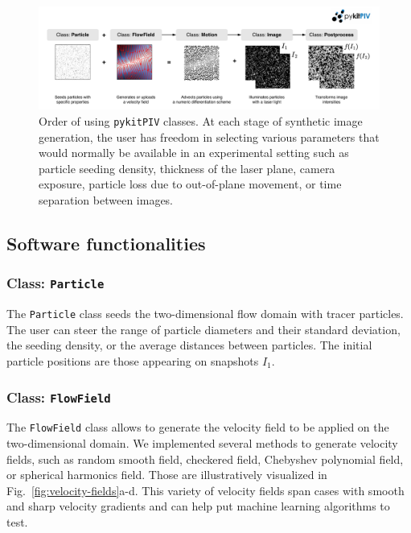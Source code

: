 \documentclass[a4paper,fleqn]{cas-dc}
\begin{document}
\begin{figure}[t]
\centering
\vspace{-0.4 in}
\includegraphics[width=\textwidth]{pykitPIV-modules.pdf}
\vspace{10 pt}
\caption{\footnotesize Order of using \texttt{pykitPIV} classes. At each stage of synthetic image generation, the user has freedom in selecting various parameters that would normally be available in an experimental setting such as particle seeding density, thickness of the laser plane, camera exposure, particle loss due to out-of-plane movement, or time separation between images.}
\label{fig:pykitPIV-overview}
\end{figure}

\subsection{Software functionalities}

\subsubsection{Class: \texttt{Particle}} \label{sec:class-Particle}

The \texttt{Particle} class seeds the two-dimensional flow domain with tracer particles. The user can steer the range of particle diameters and their standard deviation, the seeding density, or the average distances between particles. The initial particle positions are those appearing on snapshots $I_1$.

\subsubsection{Class: \texttt{FlowField}} \label{sec:class-FlowField}

The \texttt{FlowField} class allows to generate the velocity field to be applied on the two-dimensional domain. We implemented several methods to generate velocity fields, such as random smooth field, checkered field, Chebyshev polynomial field, or spherical harmonics field. Those are illustratively visualized in Fig.~\ref{fig:velocity-fields}a-d. This variety of velocity fields span cases with smooth and sharp velocity gradients and can help put machine learning algorithms to test.
\end{document}
